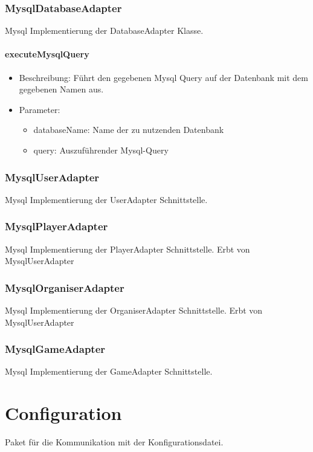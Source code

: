\documentclass[a4paper]{scrreprt}
\begin{document}
	\subsubsection{MysqlDatabaseAdapter}
	Mysql Implementierung der DatabaseAdapter Klasse.

	\paragraph{executeMysqlQuery}
	\begin{itemize}
		\item Beschreibung: Führt den gegebenen Mysql Query auf der Datenbank mit dem gegebenen Namen aus.
		\item Parameter:
		\begin{itemize}
			\item databaseName: Name der zu nutzenden Datenbank
			\item query: Auszuführender Mysql-Query
		\end{itemize}
	\end{itemize}

	\subsubsection{MysqlUserAdapter}
	Mysql Implementierung der UserAdapter Schnittstelle.

	\subsubsection{MysqlPlayerAdapter}
	Mysql Implementierung der PlayerAdapter Schnittstelle.
	Erbt von MysqlUserAdapter

	\subsubsection{MysqlOrganiserAdapter}
	Mysql Implementierung der OrganiserAdapter Schnittstelle.
	Erbt von MysqlUserAdapter

	\subsubsection{MysqlGameAdapter}
	Mysql Implementierung der GameAdapter Schnittstelle.

	\section{Configuration}
	Paket für die Kommunikation mit der Konfigurationsdatei.
\end{document}
